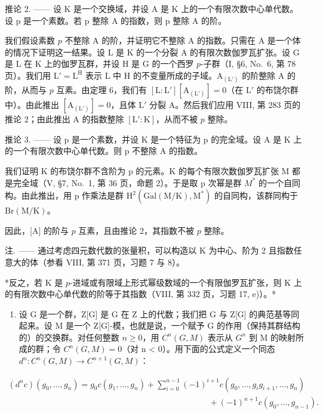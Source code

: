 推论 2. —— 设 K 是一个交换域，并设 A 是 K 上的一个有限次数中心单代数。设 p 是一个素数。若 p 整除 A 的指数，则 p 整除 A 的阶。

我们假设素数 \(p\) 不整除 A 的阶，并证明它不整除 A 的指数。只需在 A 是一个体的情况下证明这一结果。设 L 是 K 的一个分裂 A 的有限次数伽罗瓦扩张。设 G 是 L 在 K 上的伽罗瓦群，并设 H 是 G 的一个西罗 \(p\)-子群（I, §6, No.~6, 第 78 页）。我们用 \(\mathrm{L}' = \mathrm{L}^{\mathrm{H}}\) 表示 L 中 H 的不变量所成的子域。\(\mathrm{A}_{(\mathrm{L}')}\) 的阶整除 A 的阶，从而与 \(p\) 互素。由定理 6，我们有 \([\mathrm{L}:\mathrm{L}'][\mathrm{A}_{(\mathrm{L}')}] = 0\)（在 \(\mathrm{L}'\) 的布饶尔群中）。由此推出 \([\mathrm{A}_{(\mathrm{L}')}] = 0\)，且体 \(\mathrm{L}'\) 分裂 A。然后我们应用 VIII, 第 283 页的推论 2；由此推出 A 的指数整除 \([\mathrm{L}':\mathrm{K}]\)，从而不被 \(p\) 整除。

推论 3. —— 设 p 是一个素数，并设 K 是一个特征为 p 的完全域。设 A 是 K 上的一个有限次数中心单代数。则 p 不整除 A 的指数。

我们证明 K 的布饶尔群不含阶为 p 的元素。K 的每个有限次数伽罗瓦扩张 M 都是完全域（V, §7, No.~1, 第 36 页，命题 2）。于是取 p 次幂是群 \(M^{*}\) 的一个自同构。由此推出，用 p 作乘法是群 \(\mathrm{H}^{2}(\mathrm{Gal}(\mathrm{M}/\mathrm{K}),\mathrm{M}^{*})\) 的自同构，该群同构于 \(\mathrm{Br}(\mathrm{M}/\mathrm{K})\)。

因此，{[}A{]} 的阶与 \(p\) 互素，且由推论 2，其指数不被 \(p\) 整除。

注. —— 通过考虑四元数代数的张量积，可以构造以 K 为中心、阶为 2 且指数任意大的体（参看 VIII, 第 371 页，习题 7 与 8）。

*反之，若 K 是 \(p\)-进域或有限域上形式幂级数域的一个有限伽罗瓦扩张，则 K 上的有限次数中心单代数的阶等于其指数（VIII, 第 332 页，习题 17, e)）。*


\begin{enumerate}
\def\labelenumi{\arabic{enumi})}
\tightlist
\item
  设 G 是一个群，Z{[}G{]} 是 G 在 Z 上的代数；我们把 G 与 Z{[}G{]} 的典范基等同起来。设 M 是一个 Z{[}G{]}-模，也就是说，一个赋予 G 的作用（保持其群结构的）的交换群。对任何整数 \(n \geqslant 0\)，用 \(C^{n}(G, M)\) 表示从 \(G^{n}\) 到 M 的映射所成的群；令 \(C^{n}(G, M) = 0\)（对 n \textless{} 0）。用下面的公式定义一个同态 \(d^{n}: C^{n}(G, M) \to C^{n+1}(G, M)\)：
\end{enumerate}

\[
\begin{array}{c} (d ^ {n} c) (g _ {0}, \ldots , g _ {n}) = g _ {0}   c (g _ {1}, \ldots , g _ {n}) + \sum_ {i = 0} ^ {n - 1} (- 1) ^ {i + 1} c (g _ {0}, \ldots , g _ {i} g _ {i + 1}, \ldots , g _ {n}) \\ \qquad \qquad \qquad \qquad \qquad \qquad \qquad \qquad \qquad \qquad \qquad \qquad + (- 1) ^ {n + 1} c (g _ {0}, \ldots , g _ {n - 1})  . \end{array}
\]

